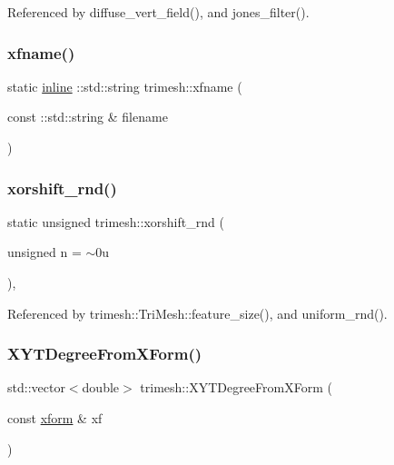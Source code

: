 Referenced by diffuse\+\_\+vert\+\_\+field(), and jones\+\_\+filter().

\mbox{\label{namespacetrimesh_a8c5b43bba4491404387a4e3a7fce60e0}} 
\subsubsection{\texorpdfstring{xfname()}{xfname()}}
{\footnotesize\ttfamily static \hyperlink{XForm_8h_a00d24c7231be28dbaf71f5408f30e44c}{inline} \+::std\+::string trimesh\+::xfname (\begin{DoxyParamCaption}\item[{const \+::std\+::string \&}]{filename }\end{DoxyParamCaption})\hspace{0.3cm}{\ttfamily [static]}}

\mbox{\label{namespacetrimesh_ae031f5f6744297540cc92742bb2ffead}} 
\subsubsection{\texorpdfstring{xorshift\+\_\+rnd()}{xorshift\_rnd()}}
{\footnotesize\ttfamily static unsigned trimesh\+::xorshift\+\_\+rnd (\begin{DoxyParamCaption}\item[{unsigned}]{n = {\ttfamily $\sim$0u} }\end{DoxyParamCaption})\hspace{0.3cm}{\ttfamily [inline]}, {\ttfamily [static]}}



Referenced by trimesh\+::\+Tri\+Mesh\+::feature\+\_\+size(), and uniform\+\_\+rnd().

\mbox{\label{namespacetrimesh_ac0f0ea541f1e548263c6fb0f09670b65}} 
\subsubsection{\texorpdfstring{X\+Y\+T\+Degree\+From\+X\+Form()}{XYTDegreeFromXForm()}}
{\footnotesize\ttfamily std\+::vector$<$double$>$ trimesh\+::\+X\+Y\+T\+Degree\+From\+X\+Form (\begin{DoxyParamCaption}\item[{const \hyperlink{namespacetrimesh_ad504958f2f56e393991b848986a8459f}{xform} \&}]{xf }\end{DoxyParamCaption})}

